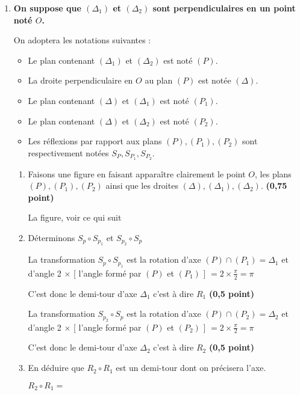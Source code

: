 \documentclass[12pt,a4paper]{article}
\begin{document}
\begin{enumerate}
\item \textbf{On suppose que \( (\Delta_1) \) et \( (\Delta_2) \) sont perpendiculaires en un point noté \( O \).}

On adoptera les notations suivantes :
\begin{itemize}
    \item Le plan contenant \( (\Delta_1) \) et \( (\Delta_2) \) est noté \( (P) \).
    \item La droite perpendiculaire en \( O \) au plan \( (P) \) est notée \( (\Delta) \).
    \item Le plan contenant \( (\Delta) \) et \( (\Delta_1) \) est noté \( (P_1) \).
    \item Le plan contenant \( (\Delta) \) et \( (\Delta_2) \) est noté \( (P_2) \).
    \item Les réflexions par rapport aux plans \( (P), (P_1), (P_2) \) sont respectivement notées \( S_P, S_{P_1}, S_{P_2} \).
\end{itemize}

\begin{enumerate}
    \item Faisons une figure en faisant apparaître clairement le point \( O \), les plans \( (P), (P_1), (P_2) \) ainsi que les droites \( (\Delta), (\Delta_1), (\Delta_2) \). \hfill \textbf{(0,75 point)}
    
    La figure, voir ce qui suit
    
    \item Déterminons \( S_{p} \circ S_{p_{1}} \) et \( S_{p_{2}} \circ S_{p} \)
    
    La transformation \( S_{p} \circ S_{p_{1}} \) est la rotation d’axe  $(P) \cap (P_{1}) = \Delta_{1}$ et  d’angle 2 $ \times $ [ l’angle formé par $(P) $ et $ (P_{1})$ ] $= 2 \times \frac{\pi}{2} = \pi $

C’est donc le demi-tour d’axe  $ \Delta_1 $ c’est à dire $ R_1 $ \hfill \textbf{(0,5 point)}

		La transformation \( S_{p_{2}} \circ S_{p}  \) est la rotation d’axe  $(P) \cap (P_{2}) = \Delta_{2}$ et  d’angle 2 $ \times $ [ l’angle formé par $(P) $ et $ (P_{2})$ ] $= 2 \times \frac{\pi}{2} = \pi $

C’est donc le demi-tour d’axe  $ \Delta_2 $ c’est à dire $ R_2 $ \hfill \textbf{(0,5 point)}

		\item En déduire que \( R_{2} \circ R_{1} \) est un demi-tour dont on précisera l’axe.
		
		 	\( R_{2} \circ R_{1} =  \)
\end{enumerate}
\end{enumerate}
\end{document}
